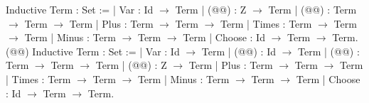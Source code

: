 Inductive Term : Set :=
| Var : Id $\rightarrow$ Term
| (@@) : Z $\rightarrow$ Term
| (@@) : Term $\rightarrow$ Term $\rightarrow$ Term
| Plus : Term $\rightarrow$ Term $\rightarrow$ Term
| Times : Term $\rightarrow$ Term $\rightarrow$ Term
| Minus : Term $\rightarrow$ Term $\rightarrow$ Term
| Choose : Id $\rightarrow$ Term $\rightarrow$ Term.
(@\hspace{0.5cm}@)
Inductive Term : Set :=
| Var : Id $\rightarrow$ Term
| (@@) : Id $\rightarrow$ Term
| (@@) : Term $\rightarrow$ Term $\rightarrow$ Term
| (@@) : Z $\rightarrow$ Term
| Plus : Term $\rightarrow$ Term $\rightarrow$ Term
| Times : Term $\rightarrow$ Term $\rightarrow$ Term
| Minus : Term $\rightarrow$ Term $\rightarrow$ Term
| Choose : Id $\rightarrow$ Term $\rightarrow$ Term.
